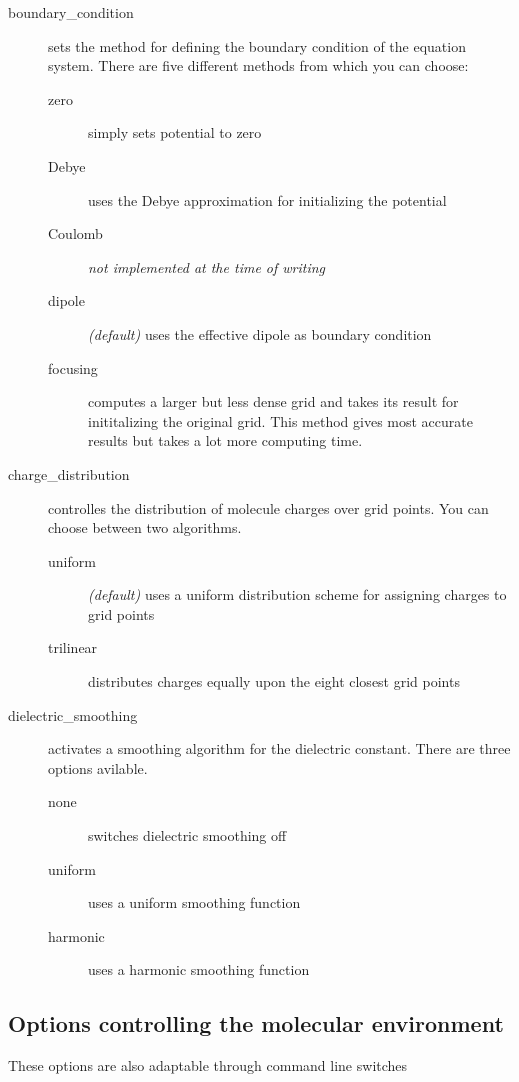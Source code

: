 \documentclass[12pt,twoside,a4paper]{article}
\begin{document}
\begin{description}
\item[boundary\_condition] sets the method for defining the boundary
	condition of the equation system. There are five different methods from
	which you can choose:
	\begin{description}
	\item[zero] simply sets potential to zero
	\item[Debye] uses the Debye approximation for initializing the potential
	\item[Coulomb] \emph{not implemented at the time of writing}
	\item[dipole] \emph{(default)} uses the effective dipole as boundary
		condition
	\item[focusing] computes a larger but less dense grid and takes its
		result for inititalizing the original grid. This method gives most
		accurate results but takes a lot more computing time.
	\end{description}
\item[charge\_distribution] controlles the distribution of molecule charges
	over grid points. You can choose between two algorithms.
	\begin{description}
	\item[uniform] \emph{(default)} uses a uniform distribution scheme for
		assigning charges to grid points
	\item[trilinear] distributes charges equally upon the eight closest grid
		points
	\end{description}
\item[dielectric\_smoothing] activates a smoothing algorithm for the
	dielectric constant. There are three options avilable.
	\begin{description}
	\item[none] switches dielectric smoothing off
	\item[uniform] uses a uniform smoothing function
	\item[harmonic] uses a harmonic smoothing function
	\end{description}
\end{description}

\subsection{Options controlling the molecular environment}

These options are also adaptable through command line switches
\end{document}
